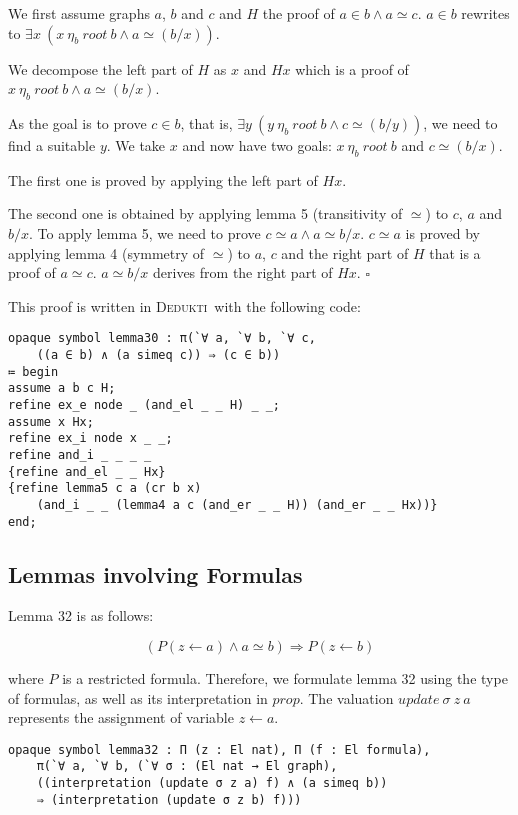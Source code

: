 \documentclass[submission,copyright,creativecommons]{eptcs}
\def\imp{\mathbin{\Rightarrow}}
\def\conj{\mathbin{\wedge}}
\def\ex{{\exists}}
\newenvironment{proof}{\noindent {\em Proof.}}{\medskip}
\newcommand{\dedukti}{\textsc{Dedukti}}
\begin{document}
\begin{proof}
We first assume graphs $a$, $b$ and $c$ and $H$ the proof of $ a \in b \conj a \simeq c $. $a \in b$ rewrites to $\ex x~(x~\eta_b~root~b \conj a \simeq (b/x))$. 

We decompose the left part of $H$ as $x$ and $Hx$ which is a proof of $x~\eta_b~root~b \conj a \simeq (b/x)$. 

As the goal is to prove $c \in b$, that is, $\ex y~(y~\eta_b~root~b \conj c \simeq (b/y))$, we need to find a suitable $y$. We take $x$ and now have two goals: $x~\eta_b~root~b$ and $c \simeq (b/x)$. 

The first one is proved by applying the left part of $Hx$. 

The second one is obtained by applying lemma 5 (transitivity of $\simeq$) to $c$, $a$ and $b/x$. To apply lemma 5, we need to prove $c \simeq a \conj a \simeq b/x$. $c \simeq a$ is proved by applying lemma 4 (symmetry of $\simeq$) to $a$, $c$ and the right part of $H$ that is a proof of $a \simeq c$. $a \simeq b/x$ derives from the right part of $Hx$. $\square$
\end{proof}

This proof is written in \dedukti ~with the following code: 

\begin{lstlisting}
opaque symbol lemma30 : π(`∀ a, `∀ b, `∀ c, 
	((a ∈ b) ∧ (a simeq c)) ⇒ (c ∈ b))
≔ begin
assume a b c H;
refine ex_e node _ (and_el _ _ H) _ _;
assume x Hx;
refine ex_i node x _ _;
refine and_i _ _ _ _
{refine and_el _ _ Hx}
{refine lemma5 c a (cr b x) 
	(and_i _ _ (lemma4 a c (and_er _ _ H)) (and_er _ _ Hx))}
end;
\end{lstlisting}

\subsection{Lemmas involving Formulas}

Lemma 32 is as follows:

$$(P(z \leftarrow a) \conj a \simeq b) \imp P(z \leftarrow b)$$

where $P$ is a restricted formula. Therefore, we formulate lemma 32 using the type of formulas, as well as its interpretation in $prop$. The valuation $update~\sigma~z~a$ represents the assignment of variable $z \leftarrow a$.

\begin{lstlisting}
opaque symbol lemma32 : Π (z : El nat), Π (f : El formula), 
	π(`∀ a, `∀ b, (`∀ σ : (El nat → El graph),
	((interpretation (update σ z a) f) ∧ (a simeq b)) 
	⇒ (interpretation (update σ z b) f)))
\end{lstlisting}
\end{document}
